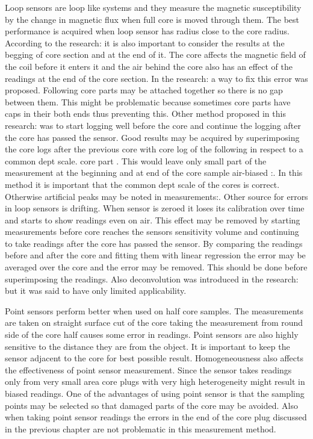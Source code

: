 \documentclass[12pt,a4paper,oneside,pdftex]{report}
\begin{document}
Loop sensors are loop like systems and they measure the magnetic susceptibility by the change in magnetic flux when full core is moved through them. 
The best performance is acquired when loop sensor has radius close to the core radius. According to the 
research\cite{Nowaczyk2001}: it is also important to consider the results at the begging of core section and at the
end of it. The core affects the magnetic field of the coil before it enters it and the air behind the core also has 
an effect of the readings at the end of the core section. In the research\cite{Nowaczyk2001}: a way to fix this 
error was proposed. Following core parts may be attached together so there is no gap between them. This might be
problematic because sometimes core parts have caps in their both ends thus preventing this. Other method proposed
in this research\cite{Nowaczyk2001}: was to start logging well before the core and continue the logging after the
core has passed the sensor. Good results may be acquired by superimposing the core logs after the previous core with
core log of the following in respect to a common dept scale.
core part . This would leave only small part of the measurement at the beginning and at
end of the core sample air-biased \cite{Nowaczyk2001}:. In this method it is important that the common dept scale
of the cores is correct. Otherwise artificial peaks may be noted in measurements\cite{Nowaczyk2001}:. Other source
for errors in loop sensors is drifting. When sensor is zeroed it loses its calibration over time and starts to 
show readings even on air. This effect may be removed by starting measurements before core reaches the sensors
sensitivity volume and continuing to take readings after the core has passed the sensor. By comparing the readings
before and after the core and fitting them with linear regression the error may be averaged over the core and the 
error may be removed. This should be done before superimposing the readings. Also deconvolution was introduced in
the research\cite{Nowaczyk2001}: but it was said to have only limited applicability.

Point sensors perform better when used on half core samples. The measurements
are taken on straight surface cut of the core taking the measurement
from round side of the core half causes some error in readings. Point
sensors are also highly sensitive to the distance they are from the object. It
is important to keep the sensor adjacent to the core for best possible result.
Homogeneousness also affects the effectiveness of point sensor measurement.
Since the sensor takes readings only from very small area core plugs with
very high heterogeneity might result in biased readings. One of the advantages
of using point sensor is that the sampling points may be selected so
that damaged parts of the core may be avoided. Also when taking point sensor
readings the errors in the end of the core plug discussed in the previous
chapter are not problematic in this measurement method.\cite{Nowaczyk2001}
\end{document}
